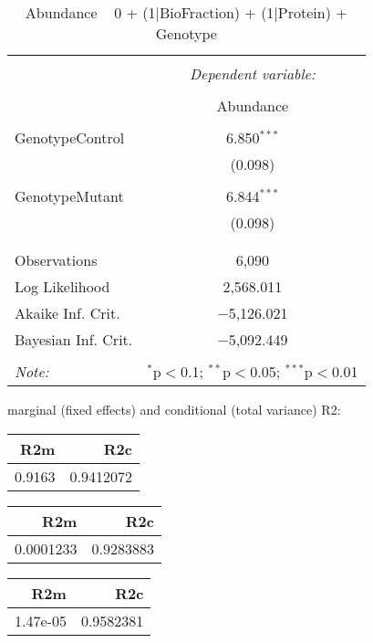 \documentclass[11pt]{report}
\begin{document}
\begin{table}[!htbp] \centering 
  \caption{Abundance ~ 0 + (1|BioFraction) + (1|Protein) + Genotype} 
  \label{} 
\begin{tabular}{@{\extracolsep{5pt}}lc} 
\\[-1.8ex]\hline 
\hline \\[-1.8ex] 
 & \multicolumn{1}{c}{\textit{Dependent variable:}} \\ 
\cline{2-2} 
\\[-1.8ex] & Abundance \\ 
\hline \\[-1.8ex] 
 GenotypeControl & 6.850$^{***}$ \\ 
  & (0.098) \\ 
  & \\ 
 GenotypeMutant & 6.844$^{***}$ \\ 
  & (0.098) \\ 
  & \\ 
\hline \\[-1.8ex] 
Observations & 6,090 \\ 
Log Likelihood & 2,568.011 \\ 
Akaike Inf. Crit. & $-$5,126.021 \\ 
Bayesian Inf. Crit. & $-$5,092.449 \\ 
\hline 
\hline \\[-1.8ex] 
\textit{Note:}  & \multicolumn{1}{r}{$^{*}$p$<$0.1; $^{**}$p$<$0.05; $^{***}$p$<$0.01} \\ 
\end{tabular} 
\end{table} 
marginal (fixed effects) and conditional (total variance) R2:

\begin{tabular}{r|r}
\hline
R2m & R2c\\
\hline
0.9163 & 0.9412072\\
\hline
\end{tabular}

\begin{tabular}{r|r}
\hline
R2m & R2c\\
\hline
0.0001233 & 0.9283883\\
\hline
\end{tabular}

\begin{tabular}{r|r}
\hline
R2m & R2c\\
\hline
1.47e-05 & 0.9582381\\
\hline
\end{tabular}
\end{document}

